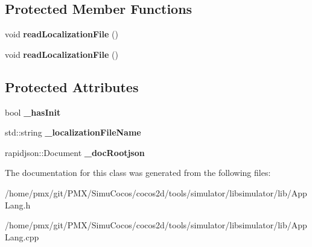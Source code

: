 \subsection*{Protected Member Functions}
\begin{DoxyCompactItemize}
\item 
\mbox{\label{classAppLang_ae4d50a08a25f9948d13101dd110253f1}} 
void {\bfseries read\+Localization\+File} ()
\item 
\mbox{\label{classAppLang_ae4d50a08a25f9948d13101dd110253f1}} 
void {\bfseries read\+Localization\+File} ()
\end{DoxyCompactItemize}
\subsection*{Protected Attributes}
\begin{DoxyCompactItemize}
\item 
\mbox{\label{classAppLang_a596559afc0ac48de6d4621fd9a3c9f34}} 
bool {\bfseries \+\_\+has\+Init}
\item 
\mbox{\label{classAppLang_a572a55e77dd640a49e967d164569a7d9}} 
std\+::string {\bfseries \+\_\+localization\+File\+Name}
\item 
\mbox{\label{classAppLang_ac773152961e71bc08ed08ba563524f8f}} 
rapidjson\+::\+Document {\bfseries \+\_\+doc\+Rootjson}
\end{DoxyCompactItemize}


The documentation for this class was generated from the following files\+:\begin{DoxyCompactItemize}
\item 
/home/pmx/git/\+P\+M\+X/\+Simu\+Cocos/cocos2d/tools/simulator/libsimulator/lib/App\+Lang.\+h\item 
/home/pmx/git/\+P\+M\+X/\+Simu\+Cocos/cocos2d/tools/simulator/libsimulator/lib/App\+Lang.\+cpp\end{DoxyCompactItemize}
